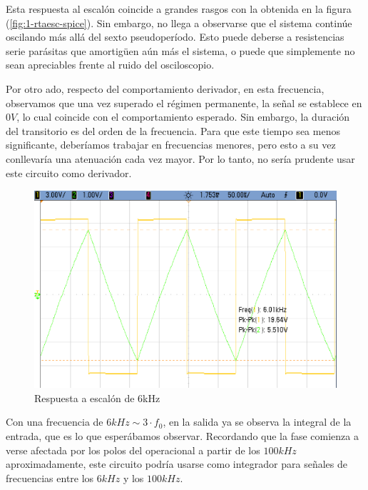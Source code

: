 \documentclass[../../tc_tp3_main.tex]{subfiles}
\begin{document}
Esta respuesta al escal\'on coincide a grandes rasgos con la obtenida en la figura (\ref{fig:1-rtaesc-spice}). Sin embargo, no llega a observarse que el sistema contin\'ue oscilando m\'as all\'a del sexto pseudoper\'iodo. Esto puede deberse a resistencias serie par\'asitas que amortig\"uen a\'un m\'as el sistema, o puede que simplemente no sean apreciables frente al ruido del osciloscopio.\par

Por otro ado, respecto del comportamiento derivador, en esta frecuencia, observamos que una vez superado el r\'egimen permanente, la se\~nal se establece en $0V$, lo cual coincide con el comportamiento esperado. Sin embargo, la duraci\'on del transitorio es del orden de la frecuencia. Para que este tiempo sea menos significante, deber\'iamos trabajar en frecuencias menores, pero esto a su vez conllevar\'ia una atenuaci\'on cada vez mayor. Por lo tanto, no ser\'ia prudente usar este circuito como derivador.

\begin{figure}[H]
	\centering
  	\includegraphics[scale = 0.32]{imagenes/tc_tp3_ej1_6kHz.png}
  	\caption{Respuesta a escal\'on de 6kHz}
  	\label{fig:1-rtaesc-6kHz}
\end{figure}

Con una frecuencia de $6kHz \sim 3\cdot f_0$, en la salida ya se observa la integral de la entrada, que es lo que esper\'abamos observar. Recordando que la fase comienza a  verse afectada por los polos del operacional a partir de los $100kHz$ aproximadamente, este circuito podr\'ia usarse como integrador para se\~nales de frecuencias entre los $6kHz$ y los $100kHz$.
\end{document}
